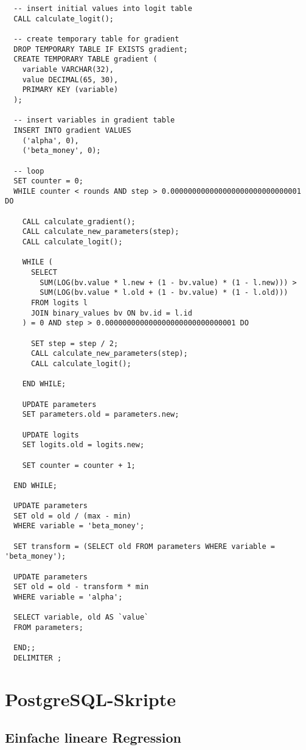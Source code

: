 \begin{verbatim}
  -- insert initial values into logit table
  CALL calculate_logit();

  -- create temporary table for gradient
  DROP TEMPORARY TABLE IF EXISTS gradient;
  CREATE TEMPORARY TABLE gradient (
    variable VARCHAR(32),
    value DECIMAL(65, 30),
    PRIMARY KEY (variable)
  );

  -- insert variables in gradient table
  INSERT INTO gradient VALUES
    ('alpha', 0),
    ('beta_money', 0);

  -- loop
  SET counter = 0;
  WHILE counter < rounds AND step > 0.000000000000000000000000000001 DO

    CALL calculate_gradient();
    CALL calculate_new_parameters(step);
    CALL calculate_logit();

    WHILE (
      SELECT
        SUM(LOG(bv.value * l.new + (1 - bv.value) * (1 - l.new))) >
        SUM(LOG(bv.value * l.old + (1 - bv.value) * (1 - l.old)))
      FROM logits l
      JOIN binary_values bv ON bv.id = l.id
    ) = 0 AND step > 0.000000000000000000000000000001 DO

      SET step = step / 2;
      CALL calculate_new_parameters(step);
      CALL calculate_logit();

    END WHILE;

    UPDATE parameters
    SET parameters.old = parameters.new;

    UPDATE logits
    SET logits.old = logits.new;

    SET counter = counter + 1;

  END WHILE;

  UPDATE parameters
  SET old = old / (max - min)
  WHERE variable = 'beta_money';

  SET transform = (SELECT old FROM parameters WHERE variable = 'beta_money');

  UPDATE parameters
  SET old = old - transform * min
  WHERE variable = 'alpha';

  SELECT variable, old AS `value`
  FROM parameters;

  END;;
  DELIMITER ;
\end{verbatim}

\chapter{PostgreSQL-Skripte}
\label{appendix:E}

\section{Einfache lineare Regression}
\label{appendix:E:1}

